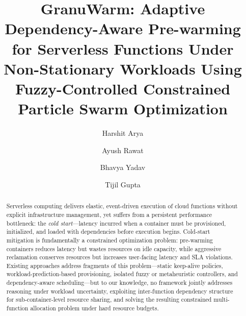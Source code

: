 \documentclass[final,5p,times,twocolumn]{elsarticle}
\begin{document}
\begin{frontmatter}

\title{GranuWarm: Adaptive Dependency-Aware Pre-warming for Serverless Functions Under Non-Stationary Workloads Using Fuzzy-Controlled Constrained Particle Swarm Optimization}

\author[nsut]{Harshit Arya}

\author[nsut]{Ayush Rawat}

\author[nsut]{Bhavya Yadav}

\author[nsut]{Tijil Gupta}


\begin{abstract}
Serverless computing delivers elastic, event-driven execution of cloud functions without explicit infrastructure management, yet suffers from a persistent performance bottleneck: the \emph{cold start}---latency incurred when a container must be provisioned, initialized, and loaded with dependencies before execution begins. Cold-start mitigation is fundamentally a constrained optimization problem: pre-warming containers reduces latency but wastes resources on idle capacity, while aggressive reclamation conserves resources but increases user-facing latency and SLA violations. Existing approaches address fragments of this problem---static keep-alive policies, workload-prediction-based provisioning, isolated fuzzy or metaheuristic controllers, and dependency-aware scheduling---but to our knowledge, no framework jointly addresses reasoning under workload uncertainty, exploiting inter-function dependency structure for sub-container-level resource sharing, and solving the resulting constrained multi-function allocation problem under hard resource budgets.


\end{abstract}
\end{frontmatter}
\end{document}

